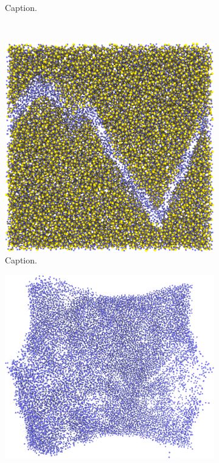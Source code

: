 \begin{figure}[htpb]
\begin{subfigure}[b]{\myfigwidth}
        \caption{Caption.}%
    \end{subfigure}%
    \\%
    \begin{subfigure}[b]{\myfigwidth}%
        \centering%
        \includegraphics[width=\textwidth]{images/systems/trimmed-rough_fracture04_05_20ang}%
        \caption{Caption.}%
    \end{subfigure}%
    \hfill%
    \begin{subfigure}[b]{\myfigwidth}%
        \centering%
        \includegraphics[width=\textwidth]{images/systems/trimmed-rough_fracture04_08}%

\end{subfigure}
\end{figure}
